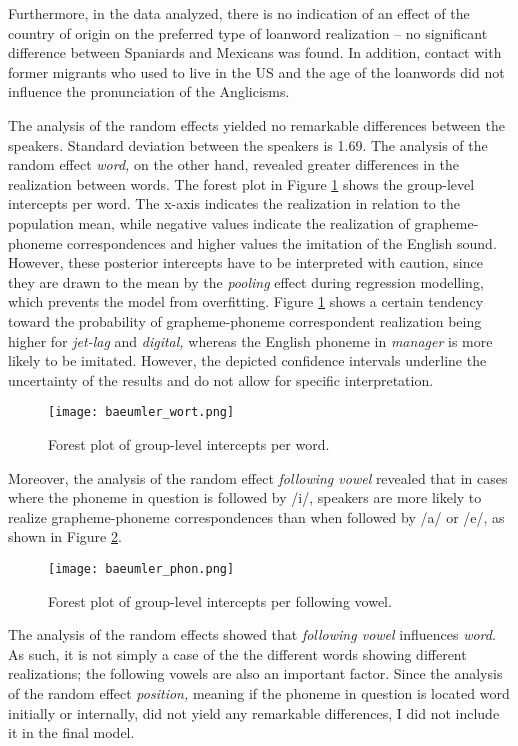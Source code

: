 \documentclass[output=paper]{langscibook}
\begin{document}
Furthermore, in the data analyzed, there is no indication of an effect of the country of origin on the preferred type of loanword realization – no significant difference between Spaniards and Mexicans was found.
In addition, contact with former migrants who used to live in the US and the age of the loanwords did not influence the pronunciation of the Anglicisms. 

The analysis of the random effects yielded no remarkable differences between the speakers. Standard deviation between the speakers is 1.69. The analysis of the random effect \textit{word,} on the other hand, revealed greater differences in the realization between words. The forest plot in Figure \ref{baumler:fig:word} shows the group-level intercepts per word. The x-axis indicates the realization in relation to the population mean, while negative values indicate the realization of grapheme-phoneme correspondences and higher values the imitation of the English sound. However, these posterior intercepts have to be interpreted with caution, since they are drawn to the mean by the \textit{pooling} effect during regression modelling, which prevents the model from overfitting. Figure \ref{baumler:fig:word} shows a certain tendency toward the probability of grapheme-phoneme correspondent realization being higher for \textit{jet-lag} and \textit{digital,} whereas the English phoneme in \textit{manager} is more likely to be imitated. However, the depicted confidence intervals underline the uncertainty of the results and do not allow for specific interpretation. 

\begin{figure}
\texttt{[image: baeumler\_wort.png]}
\caption{Forest plot of group-level intercepts per word.}
\label{baumler:fig:word}
\end{figure}

Moreover, the analysis of the random effect \textit{following vowel} revealed that in cases where the phoneme in question is followed by /i/, speakers are more likely to realize grapheme-phoneme correspondences than when followed by /a/ or /e/, as shown in Figure \ref{baumler:fig:phon}. 
\begin{figure}
\texttt{[image: baeumler\_phon.png]}
\caption{Forest plot of group-level intercepts per following vowel.}
\label{baumler:fig:phon}
\end{figure}

The analysis of the random effects showed that \textit{following vowel} influences \textit{word}. As such, it is not simply a case of the the different words showing different realizations; the following vowels are also an important factor.
Since the analysis of the random effect \textit{position,} meaning if the phoneme in question is located word initially or internally, did not yield any remarkable differences, I did not include it in the final model. 
\end{document}

